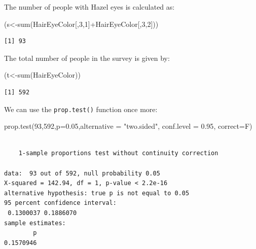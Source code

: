 \documentclass[
  letterpaper,
  DIV=11,
  numbers=noendperiod]{scrreprt}
\newenvironment{Shaded}{\begin{snugshade}}{\end{snugshade}}
\newcommand{\AttributeTok}[1]{\textcolor[rgb]{0.40,0.45,0.13}{#1}}
\newcommand{\DecValTok}[1]{\textcolor[rgb]{0.68,0.00,0.00}{#1}}
\newcommand{\FloatTok}[1]{\textcolor[rgb]{0.68,0.00,0.00}{#1}}
\newcommand{\FunctionTok}[1]{\textcolor[rgb]{0.28,0.35,0.67}{#1}}
\newcommand{\NormalTok}[1]{\textcolor[rgb]{0.00,0.23,0.31}{#1}}
\newcommand{\OtherTok}[1]{\textcolor[rgb]{0.00,0.23,0.31}{#1}}
\newcommand{\SpecialCharTok}[1]{\textcolor[rgb]{0.37,0.37,0.37}{#1}}
\newcommand{\StringTok}[1]{\textcolor[rgb]{0.13,0.47,0.30}{#1}}
\begin{document}
The number of people with Hazel eyes is calculated as:

\begin{Shaded}
\begin{Highlighting}[numbers=left,,]
\NormalTok{(s}\OtherTok{\textless{}{-}}\FunctionTok{sum}\NormalTok{(HairEyeColor[,}\DecValTok{3}\NormalTok{,}\DecValTok{1}\NormalTok{]}\SpecialCharTok{+}\NormalTok{HairEyeColor[,}\DecValTok{3}\NormalTok{,}\DecValTok{2}\NormalTok{]))}
\end{Highlighting}
\end{Shaded}

\begin{verbatim}
[1] 93
\end{verbatim}

The total number of people in the survey is given by:

\begin{Shaded}
\begin{Highlighting}[numbers=left,,]
\NormalTok{(t}\OtherTok{\textless{}{-}}\FunctionTok{sum}\NormalTok{(HairEyeColor))}
\end{Highlighting}
\end{Shaded}

\begin{verbatim}
[1] 592
\end{verbatim}

We can use the \texttt{prop.test()} function once more:

\begin{Shaded}
\begin{Highlighting}[numbers=left,,]
\FunctionTok{prop.test}\NormalTok{(}\DecValTok{93}\NormalTok{,}\DecValTok{592}\NormalTok{,}\AttributeTok{p=}\FloatTok{0.05}\NormalTok{,}\AttributeTok{alternative =} \StringTok{"two.sided"}\NormalTok{, }\AttributeTok{conf.level =} \FloatTok{0.95}\NormalTok{, }\AttributeTok{correct=}\NormalTok{F)}
\end{Highlighting}
\end{Shaded}

\begin{verbatim}

    1-sample proportions test without continuity correction

data:  93 out of 592, null probability 0.05
X-squared = 142.94, df = 1, p-value < 2.2e-16
alternative hypothesis: true p is not equal to 0.05
95 percent confidence interval:
 0.1300037 0.1886070
sample estimates:
        p 
0.1570946 
\end{verbatim}
\end{document}
